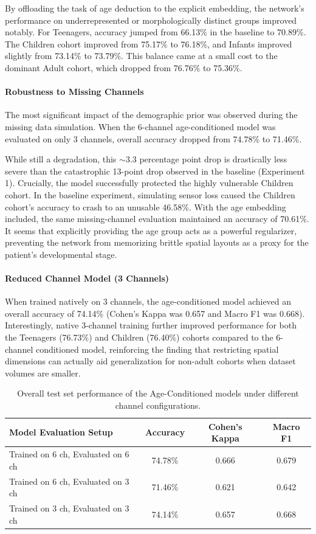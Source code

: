 By offloading the task of age deduction to the explicit embedding, the network's performance on underrepresented or morphologically distinct groups improved notably. For Teenagers, accuracy jumped from 66.13\% in the baseline to 70.89\%. The Children cohort improved from 75.17\% to 76.18\%, and Infants improved slightly from 73.14\% to 73.79\%. This balance came at a small cost to the dominant Adult cohort, which dropped from 76.76\% to 75.36\%.

\paragraph{Robustness to Missing Channels}
The most significant impact of the demographic prior was observed during the missing data simulation. When the 6-channel age-conditioned model was evaluated on only 3 channels, overall accuracy dropped from 74.78\% to 71.46\%. 

While still a degradation, this $\sim$3.3 percentage point drop is drastically less severe than the catastrophic 13-point drop observed in the baseline (Experiment 1). Crucially, the model successfully protected the highly vulnerable Children cohort. In the baseline experiment, simulating sensor loss caused the Children cohort's accuracy to crash to an unusable 46.58\%. With the age embedding included, the same missing-channel evaluation maintained an accuracy of 70.61\%. It seems that explicitly providing the age group acts as a powerful regularizer, preventing the network from memorizing brittle spatial layouts as a proxy for the patient's developmental stage.

\paragraph{Reduced Channel Model (3 Channels)}
When trained natively on 3 channels, the age-conditioned model achieved an overall accuracy of 74.14\% (Cohen's Kappa was 0.657 and Macro F1 was 0.668). Interestingly, native 3-channel training further improved performance for both the Teenagers (76.73\%) and Children (76.40\%) cohorts compared to the 6-channel conditioned model, reinforcing the finding that restricting spatial dimensions can actually aid generalization for non-adult cohorts when dataset volumes are smaller.

\begin{table}[ht]
\centering
\caption{Overall test set performance of the Age-Conditioned models under different channel configurations.}
\label{tab:exp2_overall_results}
\begin{tabular}{l c c c}
\toprule
\textbf{Model Evaluation Setup} & \textbf{Accuracy} & \textbf{Cohen's Kappa} & \textbf{Macro F1} \\
\midrule
Trained on 6 ch, Evaluated on 6 ch & 74.78\% & 0.666 & 0.679 \\
Trained on 6 ch, Evaluated on 3 ch & 71.46\% & 0.621 & 0.642 \\
Trained on 3 ch, Evaluated on 3 ch & 74.14\% & 0.657 & 0.668 \\
\bottomrule
\end{tabular}
\end{table}

